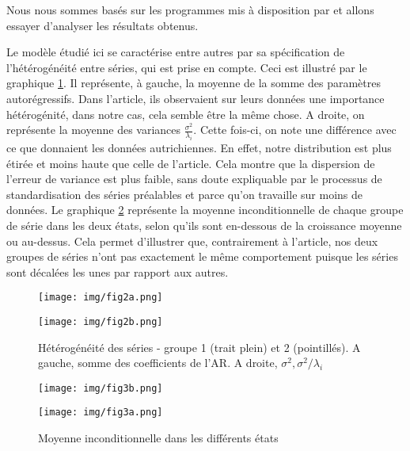 \documentclass[10pt,french,french]{article}
\begin{document}
Nous nous sommes basés sur les programmes mis à disposition par \cite{Kaufmann} et allons essayer d'analyser les résultats obtenus.

Le modèle étudié ici se caractérise entre autres par sa spécification de l'hétérogénéité entre séries, qui est prise en compte. Ceci est illustré par le graphique \ref{heterogeneite}. Il représente, à gauche, la moyenne de la somme des paramètres autorégressifs. Dans l'article, ils observaient sur leurs données une importance hétérogénité, dans notre cas, cela semble être la même chose. A droite, on représente la moyenne des variances \(\frac{\sigma^2}{\lambda_i}\). Cette fois-ci, on note une différence avec ce que donnaient les données autrichiennes. En effet, notre distribution est plus étirée et moins haute que celle de l'article. Cela montre que la dispersion de l'erreur de variance est plus faible, sans doute expliquable par le processus de standardisation des séries préalables et parce qu'on travaille sur moins de données. Le graphique \ref{etats} représente la moyenne inconditionnelle de chaque groupe de série dans les deux états, selon qu'ils sont en-dessous de la croissance moyenne ou au-dessus. Cela permet d'illustrer que, contrairement à l'article, nos deux groupes de séries n'ont pas exactement le même comportement puisque les séries sont décalées les unes par rapport aux autres.

\begin{figure}
\begin{minipage}{.5\textwidth}
\texttt{[image: img/fig2a.png]}
\end{minipage}
\hfill
\begin{minipage}{.5\textwidth}
\texttt{[image: img/fig2b.png]}
\end{minipage}
\caption{Hétérogénéité des séries - groupe 1 (trait plein) et 2 (pointillés). A gauche, somme des coefficients de l'AR. A droite, $\sigma^2, \sigma^2/\lambda_i$}
\label{heterogeneite}
\end{figure}

\begin{figure}
\begin{minipage}{.5\textwidth}
\texttt{[image: img/fig3b.png]}
\end{minipage}
\hfill
\begin{minipage}{.5\textwidth}
\texttt{[image: img/fig3a.png]}
\end{minipage}
\caption{Moyenne inconditionnelle dans les différents états}
\label{etats}
\end{figure}
\end{document}
